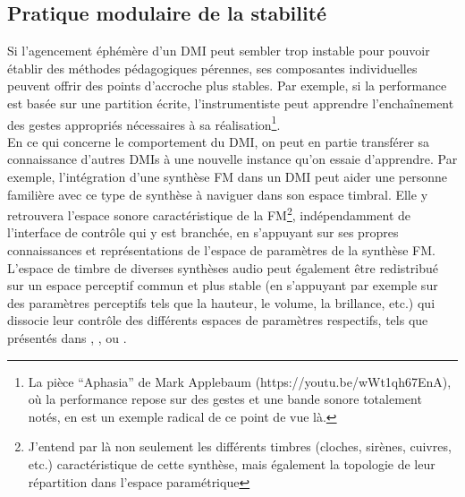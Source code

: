 \subsection{Pratique modulaire de la stabilité}

\noindent Si l'agencement éphémère d'un \gls{DMI} peut sembler trop instable pour pouvoir établir des méthodes pédagogiques pérennes, ses composantes individuelles peuvent offrir des points d'accroche plus stables. Par exemple, si la performance est basée sur une partition écrite, l'instrumentiste peut apprendre l'enchaînement des gestes appropriés nécessaires à sa réalisation\footnote{La pièce ``Aphasia'' de Mark Applebaum (https://youtu.be/wWt1qh67EnA), où la performance repose sur des gestes et une bande sonore totalement notés, en est un exemple radical de ce point de vue là.}.\\
\indent En ce qui concerne le comportement du \gls{DMI}, on peut en partie transférer sa connaissance d'autres \glspl{DMI} à une nouvelle instance qu'on essaie d'apprendre. Par exemple, l'intégration d'une synthèse \gls{FM} dans un \gls{DMI} peut aider une personne familière avec ce type de synthèse à naviguer dans son espace timbral. Elle y retrouvera l'espace sonore caractéristique de la \gls{FM}\footnote{J'entend par là non seulement les différents timbres (cloches, sirènes, cuivres, etc.) caractéristique de cette synthèse, mais également la topologie de leur répartition dans l'espace paramétrique}, indépendamment de l'interface de contrôle qui y est branchée, en s'appuyant sur ses propres connaissances et représentations de l'espace de paramètres de la synthèse \gls{FM}. L'espace de timbre de diverses synthèses audio peut également être redistribué sur un espace perceptif commun et plus stable (en s'appuyant par exemple sur des paramètres perceptifs tels que la hauteur, le volume, la brillance, etc.) qui dissocie leur contrôle des différents espaces de paramètres respectifs, tels que présentés dans \cite{wessel_timbre_1979}, \cite{arfib_strategies_2002}, \cite{schwarz_sound_2012} ou \cite{tubb_divergent_2014}.

